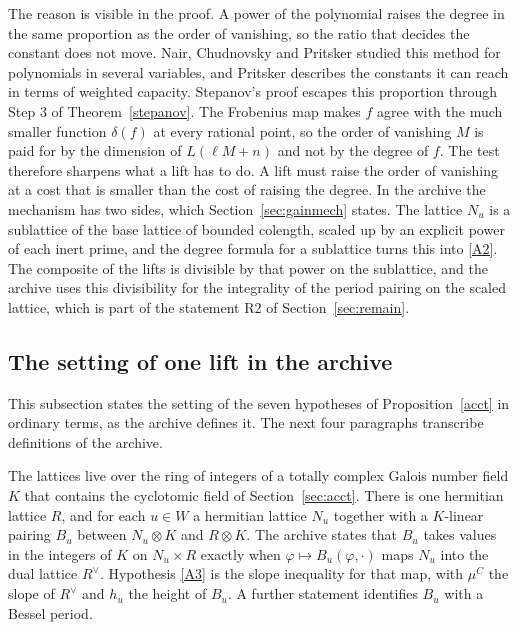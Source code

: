 \documentclass[11pt,letterpaper]{article}
\numberwithin{equation}{section}
\begin{document}
The reason is visible in the proof. A power of the polynomial raises the degree in the same proportion as the order of vanishing, so the ratio that decides the constant does not move. Nair, Chudnovsky and Pritsker studied this method for polynomials in several variables, and Pritsker \cite{pritsker} describes the constants it can reach in terms of weighted capacity. Stepanov's proof escapes this proportion through Step 3 of Theorem~\ref{stepanov}. The Frobenius map makes $f$ agree with the much smaller function $\delta(f)$ at every rational point, so the order of vanishing $M$ is paid for by the dimension of $L(\ell M+n)$ and not by the degree of $f$. The test therefore sharpens what a lift has to do. A lift must raise the order of vanishing at a cost that is smaller than the cost of raising the degree. In the archive the mechanism has two sides, which Section~\ref{sec:gainmech} states. The lattice $N_u$ is a sublattice of the base lattice of bounded colength, scaled up by an explicit power of each inert prime, and the degree formula for a sublattice turns this into \eqref{A2}. The composite of the lifts is divisible by that power on the sublattice, and the archive uses this divisibility for the integrality of the period pairing on the scaled lattice, which is part of the statement R2 of Section~\ref{sec:remain}.

\subsection{The setting of one lift in the archive}\label{sec:setting}

This subsection states the setting of the seven hypotheses of Proposition~\ref{acct} in ordinary terms, as the archive defines it. The next four paragraphs transcribe definitions of the archive.

The lattices live over the ring of integers of a totally complex Galois number field $K$ that contains the cyclotomic field of Section~\ref{sec:acct}. There is one hermitian lattice $R$, and for each $u\in W$ a hermitian lattice $N_u$ together with a $K$-linear pairing $B_u$ between $N_u\otimes K$ and $R\otimes K$. The archive states that $B_u$ takes values in the integers of $K$ on $N_u\times R$ exactly when $\varphi\mapsto B_u(\varphi,\cdot)$ maps $N_u$ into the dual lattice $R^\vee$. Hypothesis \eqref{A3} is the slope inequality for that map, with $\mu^C$ the slope of $R^\vee$ and $h_u$ the height of $B_u$. A further statement identifies $B_u$ with a Bessel period.
\end{document}
